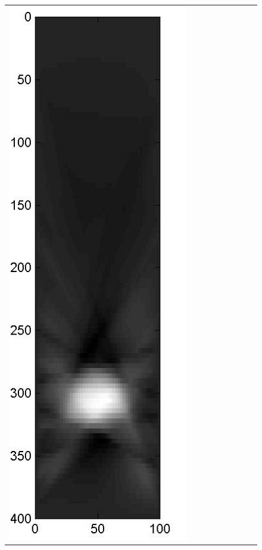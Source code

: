 \documentclass[english]{siamltex}
\begin{document}
{\begin{figure}[!h]
\begin{center}
\begin{tabular}{|c|c|c|c|c|c|c|c|c|}
			\includegraphics[width=.9\iwidth]{figures/newFigs/noisy/resultsExp-7-mk}
			&

\end{tabular}
\end{center}
\end{figure}}
\end{document}
